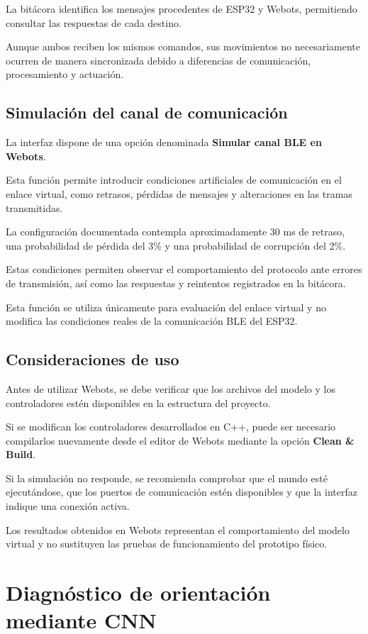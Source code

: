 \documentclass[letterpaper,journal]{IEEEtran}
\begin{document}
La bitácora identifica los mensajes
procedentes de ESP32 y Webots,
permitiendo consultar las respuestas
de cada destino.

Aunque ambos reciben los mismos
comandos, sus movimientos no
necesariamente ocurren de manera
sincronizada debido a diferencias
de comunicación, procesamiento
y actuación.

\subsection{Simulación del canal de comunicación}

La interfaz dispone de una opción
denominada \textbf{Simular canal BLE en Webots}.

Esta función permite introducir
condiciones artificiales de comunicación
en el enlace virtual, como retrasos,
pérdidas de mensajes y alteraciones
en las tramas transmitidas.

La configuración documentada contempla
aproximadamente 30 ms de retraso,
una probabilidad de pérdida del 3\%
y una probabilidad de corrupción del 2\%.

Estas condiciones permiten observar
el comportamiento del protocolo
ante errores de transmisión, así
como las respuestas y reintentos
registrados en la bitácora.

Esta función se utiliza únicamente
para evaluación del enlace virtual
y no modifica las condiciones reales
de la comunicación BLE del ESP32.

\subsection{Consideraciones de uso}

Antes de utilizar Webots, se debe
verificar que los archivos del modelo
y los controladores estén disponibles
en la estructura del proyecto.

Si se modifican los controladores
desarrollados en C++, puede ser
necesario compilarlos nuevamente
desde el editor de Webots mediante
la opción \textbf{Clean \& Build}.

Si la simulación no responde,
se recomienda comprobar que el mundo
esté ejecutándose, que los puertos
de comunicación estén disponibles
y que la interfaz indique una
conexión activa.

Los resultados obtenidos en Webots
representan el comportamiento del
modelo virtual y no sustituyen
las pruebas de funcionamiento
del prototipo físico.

\section{Diagnóstico de orientación mediante CNN}
\label{sec:diagnostico_cnn}
\end{document}
